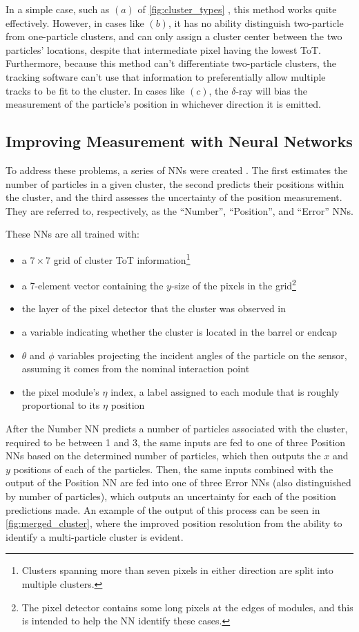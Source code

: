 In a simple case, such as $(a)$ of \autoref{fig:cluster_types} , this method works quite effectively. However, in cases like $(b)$, it has no ability distinguish two-particle from one-particle clusters, and can only assign a cluster center between the two particles' locations, despite that intermediate pixel having the lowest \ac{ToT}. Furthermore, because this method can't differentiate two-particle clusters, the tracking software can't use that information to preferentially allow multiple tracks to be fit to the cluster. In cases like $(c)$, the $\delta$-ray will bias the measurement of the particle's position in whichever direction it is emitted. 

\subsection{Improving Measurement with Neural Networks}

To address these problems, a series of \acp{NN} were created \cite{PERF-2012-05}. The first estimates the number of particles in a given cluster, the second predicts their positions within the cluster, and the third assesses the uncertainty of the position measurement. They are referred to, respectively, as the ``Number'', ``Position'', and ``Error'' \acp{NN}.

These \acp{NN} are all trained with: 
\begin{itemize}
\item a $7\times7$ grid of cluster \ac{ToT} information\footnote{Clusters spanning more than seven pixels in either direction are split into multiple clusters.}
\item a 7-element vector containing the $y$-size of the pixels in the grid\footnote{The pixel detector contains some long pixels at the edges of modules, and this is intended to help the \ac{NN} identify these cases.}
\item the layer of the pixel detector that the cluster was observed in
\item a variable indicating whether the cluster is located in the barrel or endcap
\item $\theta$ and $\phi$ variables projecting the incident angles of the particle on the sensor, assuming it comes from the nominal interaction point 
\item the pixel module's $\eta$ index, a label assigned to each module that is roughly proportional to its $\eta$ position
\end{itemize}

After the Number \ac{NN} predicts a number of particles associated with the cluster, required to be between 1 and 3, the same inputs are fed to one of three Position \acp{NN} based on the determined number of particles, which then outputs the $x$ and $y$ positions of each of the particles. Then, the same inputs combined with the output of the Position \ac{NN} are fed into one of three Error \acp{NN} (also distinguished by number of particles), which outputs an uncertainty for each of the position predictions made. An example of the output of this process can be seen in \autoref{fig:merged_cluster}, where the improved position resolution from the ability to identify a multi-particle cluster is evident. 

